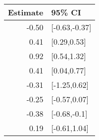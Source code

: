 \begin{tabular}{rl}
  \hline
Estimate & 95\% CI \\ 
  \hline
-0.50 & [-0.63,-0.37] \\ 
  0.41 & [0.29,0.53] \\ 
  0.92 & [0.54,1.32] \\ 
  0.41 & [0.04,0.77] \\ 
  -0.31 & [-1.25,0.62] \\ 
  -0.25 & [-0.57,0.07] \\ 
  -0.38 & [-0.68,-0.1] \\ 
  0.19 & [-0.61,1.04] \\ 
   \hline
\end{tabular}

